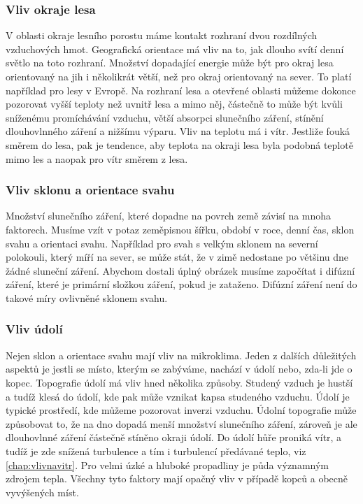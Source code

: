 \subsubsection{Vliv okraje lesa}
V oblasti okraje lesního porostu máme kontakt rozhraní dvou rozdílných vzduchových hmot. Geografická orientace má vliv na to, jak dlouho svítí denní světlo na toto rozhraní. Množství dopadající energie může být pro okraj lesa orientovaný na jih i několikrát větší, než pro okraj orientovaný na sever. To platí například pro lesy v Evropě. Na rozhraní lesa a otevřené oblasti můžeme dokonce pozorovat vyšší teploty než uvnitř lesa a mimo něj, částečně to může být kvůli sníženému promíchávání vzduchu, větší absorpci slunečního záření, stínění dlouhovlnného záření a nižšímu výparu. Vliv na teplotu má i vítr. Jestliže fouká směrem do lesa, pak je tendence, aby teplota na okraji lesa byla podobná teplotě mimo les a naopak pro vítr směrem z lesa\cite{alma}.

\subsubsection{Vliv sklonu a orientace svahu}
Množství slunečního záření, které dopadne na povrch země závisí na mnoha faktorech. Musíme vzít v potaz zeměpisnou šířku, období v roce, denní čas, sklon svahu a orientaci svahu. Například pro svah s velkým sklonem na severní polokouli, který míří na sever, se může stát, že v zimě nedostane po většinu dne žádné sluneční záření. Abychom dostali úplný obrázek musíme započítat i difúzní záření, které je primární složkou záření, pokud je zataženo. Difúzní záření není do takové míry ovlivněné sklonem svahu\cite{alma}.

\subsubsection{Vliv údolí}
Nejen sklon a orientace svahu mají vliv na mikroklima. Jeden z dalších důležitých aspektů je jestli se místo, kterým se zabýváme, nachází v údolí nebo, zda-li jde o kopec. Topografie údolí má vliv hned několika způsoby. Studený vzduch je hustší a tudíž klesá do údolí, kde pak může vznikat kapsa studeného vzduchu. Údolí je typické prostředí, kde můžeme pozorovat inverzi vzduchu. Údolní topografie může způsobovat to, že na dno dopadá menší množství slunečního záření, zároveň je ale dlouhovlnné záření částečně stíněno okraji údolí. Do údolí hůře proniká vítr, a tudíž je zde snížená turbulence a tím i turbulencí předávané teplo, viz \ref{chap:vlivnavitr}. Pro velmi úzké a hluboké propadliny je půda významným zdrojem tepla. Všechny tyto faktory mají opačný vliv v případě kopců a obecně vyvýšených míst\cite{alma}. 

